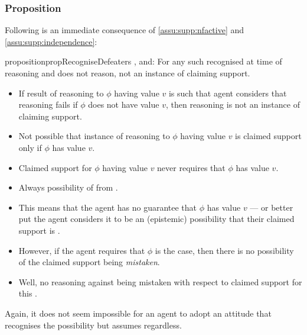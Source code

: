 \subsubsection{Proposition}
\label{sec:proposition}

\begin{note}
  Following is an immediate consequence of \ref{assu:supp:nfactive} and \autoref{assu:supp:independence}:

  \begin{restatable}{proposition}{propRecogniseDefeaters}
    \label{prop:CS-only-if-reason-recognised-defeaters}
    \requ{}, and:
    For any such recognised \requ{} at time of reasoning and does not reason, not an instance of claiming support.
  \end{restatable}
\end{note}

  \begin{note}
  \begin{itemize}
  \item If result of reasoning to \(\phi\) having value \(v\) is such that agent considers that reasoning fails if \(\phi\) does not have value \(v\), then reasoning is not an instance of claiming support.
  \item Not possible that instance of reasoning to \(\phi\) having value \(v\) is claimed support only if \(\phi\) has value \(v\).
  \item Claimed support for \(\phi\) having value \(v\) never requires that \(\phi\) has value \(v\).
  \end{itemize}
\end{note}

\begin{note}
  \color{red}
    \begin{itemize}
    \item Always possibility of \mom{} from \nfcs{}.
    \item This means that the agent has no guarantee that \(\phi\) has value \(v\) --- or better put the agent considers it to be an (epistemic) possibility that their claimed support is \mom{}.
    \item However, if the agent requires that \(\phi\) is the case, then there is no possibility of the claimed support being \emph{mistaken}.
    \item Well, no reasoning against being mistaken with respect to claimed support for this \requ{}.
  \end{itemize}

  Again, it does not seem impossible for an agent to adopt an attitude that recognises the possibility but assumes regardless.
\end{note}



